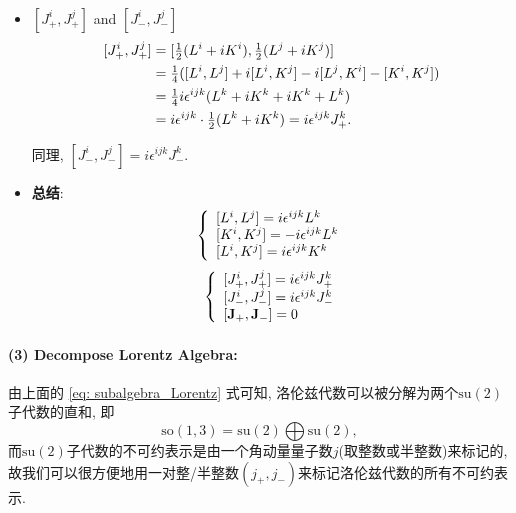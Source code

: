 \begin{itemize}
\begin{equation}
\begin{aligned}
          \end{aligned}
        \end{equation}
  \item $[J_+^i, J_+^j]$ and $[J_-^i, J_-^j]$
        \begin{equation}
          \begin{aligned}
            \relax[J_+^i, J_+^j] & = [\tfrac{1}{2}(L^i+iK^i), \tfrac{1}{2}(L^j+iK^j)]                   \\
                                 & = \tfrac{1}{4}([L^i, L^j]+i[L^i, K^j]-i[L^j, K^i]-[K^i, K^j])        \\
                                 & = \tfrac{1}{4}i\epsilon^{ijk}(L^k + iK^k + iK^k + L^k)               \\
                                 & = i\epsilon^{ijk}\cdot\tfrac{1}{2}(L^k+iK^k) = i\epsilon^{ijk}J_+^k.
          \end{aligned}
        \end{equation}

        同理, $[J_-^i, J_-^j] = i\epsilon^{ijk}J_-^k$.
  \item \textbf{总结}:
        \begin{equation}
          \left\{\begin{array}{l}
            \relax[L^i, L^j] = i\epsilon^{ijk}L^k  \\
            \relax[K^i, K^j] = -i\epsilon^{ijk}L^k \\
            \relax[L^i, K^j] = i\epsilon^{ijk}K^k
          \end{array} \right.
        \end{equation}
        \begin{equation}{\label{eq: subalgebra_Lorentz}}
          \left\{\begin{array}{l}
            \relax[J_+^i, J_+^j] = i\epsilon^{ijk}J_+^k \\
            \relax[J_-^i, J_-^j] = i\epsilon^{ijk}J_-^k \\
            \relax[\mathbf{J}_+, \mathbf{J}_-] = 0
          \end{array} \right.
        \end{equation}
\end{itemize}

\paragraph*{(3) Decompose Lorentz Algebra:}
由上面的 \eqref{eq: subalgebra_Lorentz} 式可知, 洛伦兹代数可以被分解为两个$\text{su}(2)$子代数的直和, 即
\begin{equation}
  \text{so}(1, 3) = \text{su}(2) \bigoplus \text{su}(2),
\end{equation}
而$\text{su}(2)$子代数的不可约表示是由一个角动量量子数$j$(取整数或半整数)来标记的, 故我们可以很方便地用一对整/半整数$(j_+, j_-)$来标记洛伦兹代数的所有不可约表示.

